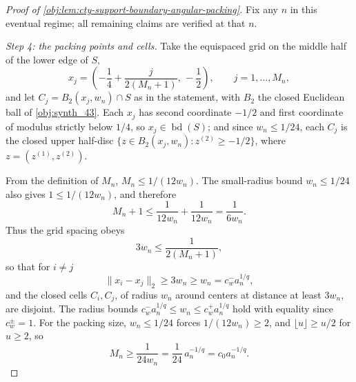 \begin{proof}[Proof of \cref{obj:lem:cty-support-boundary-angular-packing}]
Fix any \(n\) in this eventual regime; all remaining claims are verified at that \(n\).

\emph{Step 4: the packing points and cells.}  Take the equispaced grid on the middle half of the lower edge of \(S\),
\[
x_j=\left(-\frac14+\frac{j}{2(M_n+1)},\,-\frac12\right),
\qquad j=1,\ldots,M_n,
\]
and let \(C_j=B_2(x_j,w_n)\cap S\) as in the statement, with \(B_2\) the closed Euclidean ball of \cref{obj:synth_43}.  Each \(x_j\) has second coordinate \(-1/2\) and first coordinate of modulus strictly below \(1/4\), so \(x_j\in\operatorname{bd}(S)\); and since \(w_n\le1/24\), each \(C_j\) is the closed upper half-disc \(\{z\in B_2(x_j,w_n):z^{(2)}\ge-1/2\}\), where \(z=(z^{(1)},z^{(2)})\).

From the definition of \(M_n\), \(M_n\le 1/(12w_n)\).  The small-radius bound \(w_n\le1/24\) also gives \(1\le1/(12w_n)\), and therefore
\[
M_n+1\le \frac{1}{12w_n}+\frac{1}{12w_n}=\frac1{6w_n}.
\]
Thus the grid spacing obeys
\[
3w_n\le\frac1{2(M_n+1)} ,
\]
so that for \(i\ne j\)
\[
\lVert x_i-x_j\rVert_2\ge 3w_n\ge w_n=c_w^-a_n^{1/q},
\]
and the closed cells \(C_i,C_j\), of radius \(w_n\) around centers at distance at least \(3w_n\), are disjoint.
The radius bounds \(c_w^-a_n^{1/q}\le w_n\le c_w^+a_n^{1/q}\) hold with equality since \(c_w^\pm=1\).  For the packing size, \(w_n\le1/24\) forces \(1/(12w_n)\ge2\), and \(\lfloor u\rfloor\ge u/2\) for \(u\ge2\), so
\[
M_n\ge\frac1{24w_n}=\frac1{24}\,a_n^{-1/q}=c_0a_n^{-1/q}.
\]


\end{proof}
